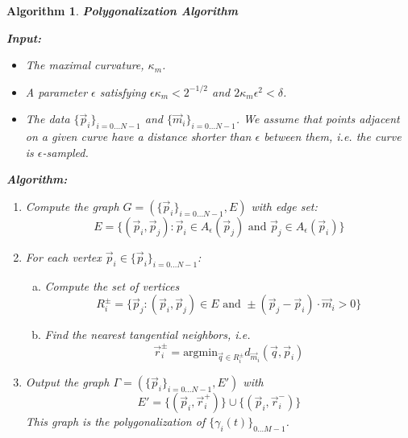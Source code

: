 \documentclass{article}
\newtheorem{algo}{Algorithm}
\numberwithin{cntr}{section}
\numberwithin{equation}{section}
\newcommand{\vp}[0]{{\vec{p}}}
\newcommand{\vq}[0]{{\vec{q}}}
\newcommand{\vr}[0]{{\vec{r}}}
\newcommand{\vm}[0]{{\vec{m}}}
\newcommand{\Oto}[1]{{0 \ldots #1-1}}
\newcommand{\OtoN}{{0 \ldots N-1}}
\newcommand{\pointData}{{ \{ \vp_{i} \}_{i=\OtoN} }}
\newcommand{\tanData}{{ \{ \vm_{i} \}_{i=\OtoN} }}
\newcommand{\curveSet}{{ \{ \gamma_i(t) \}_{\Oto{M}}}}
\newcommand{\allowed}[2]{ { A_{#1}(#2) } }
\newcommand{\curvemax}{{\kappa_{m}}}
\newcommand{\curvesep}{{\delta}}
\begin{document}
\begin{algo}
  \label{algo:polygonalization}
  {\bf Polygonalization Algorithm }

  { \bf Input: }

  \begin{itemize}
  \item The maximal curvature, $\curvemax$.
  \item A parameter $\epsilon$ satisfying $\epsilon \curvemax < 2^{-1/2}$ and $2 \curvemax \epsilon^{2} < \curvesep$.
  \item The data $\pointData$ and $\tanData$. We assume that points adjacent on a given curve have a distance shorter than $\epsilon$ between them, i.e. the curve is $\epsilon$-sampled.
  \end{itemize}


  {\bf Algorithm: }

  \begin{enumerate}
  \item Compute the graph $G = (\pointData, E)$ with edge set:
    \begin{equation*}
      E = \{ (\vp_{i},\vp_{j}) : \vp_{i} \in \allowed{\epsilon}{\vp_{j}} \textrm{~and~} \vp_{j} \in \allowed{\epsilon}{\vp_{i}}\}
    \end{equation*}
  \item For each vertex $\vp_{i} \in \pointData$:
    \begin{enumerate}[a.]
    \item Compute the set of vertices
      \begin{equation*}
        R^{\pm}_{i} = \{ \vp_{j} : (\vp_{i}, \vp_{j}) \in E \textrm{~and~} \pm (\vp_{j}-\vp_{i}) \cdot \vm_{i} > 0 \}
      \end{equation*}
    \item Find the nearest tangential neighbors, i.e.
      \begin{equation*}
        \vr^{\pm}_{i} = \textrm{argmin}_{\vq \in R^{\pm}_{i}} d_{\vm_{i}}(\vq, \vp_{i})
      \end{equation*}
    \end{enumerate}
  \item Output the graph $\Gamma = ( \pointData, E')$ with
    \begin{equation*}
      E' = \{ (\vp_{i}, \vr^{+}_{i}) \} \cup \{ (\vp_{i}, \vr^{-}_{i}) \}
    \end{equation*}
    This graph is the polygonalization of $\curveSet$.
  \end{enumerate}

\end{algo}
\end{document}

